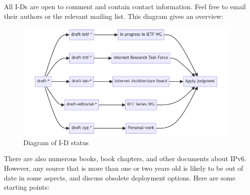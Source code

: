 \documentclass[
]{article}
\begin{document}
All I-Ds are open to comment and contain contact information. Feel free
to email their authors or the relevant mailing list. This diagram gives
an overview:

\begin{figure}
\centering
\includegraphics{id-diagram.png}
\caption{Diagram of I-D status}
\end{figure}

There are also numerous books, book chapters, and other documents about
IPv6. However, any source that is more than one or two years old is
likely to be out of date in some aspects, and discuss obsolete
deployment options. Here are some starting points:
\end{document}
